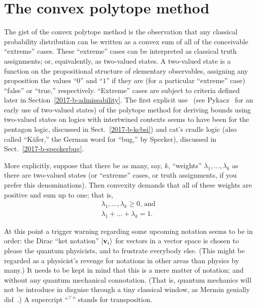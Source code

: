 \documentclass[%
  twocolumn,
 showpacs,
 showkeys,
 preprintnumbers,
 amsmath,amssymb,
 aps,
  pra,
  longbibliography,
 floatfix,
 ]{revtex4-1}
\begin{document}
\section{The convex polytope method}
\label{2017-b-chm}

The gist of the convex polytope method is the observation that
any classical probability distribution can be written as a convex sum of all of the conceivable ``extreme'' cases.
These ``extreme'' cases can be interpreted as classical truth assignments; or, equivalently,
as two-valued states. A two-valued state is a function on the propositional structure of elementary observables,
assigning any proposition the values ``$0$'' and ``$1$'' if they are (for a particular ``extreme'' case)
``false'' or ``true,'' respectively.
``Extreme'' cases are subject to  criteria defined later in Section~\ref{2017-b-admissability}.
The first explicit use~\cite{svozil-2001-cesena,svozil-2001-eua,svozil-2008-ql,svozil-2016-s}
(see Pykacz~\cite{Pykacz1989} for an early use of two-valued states)
of the polytope method for deriving bounds using two-valued states on logics with intertwined contexts
seems to have been for the pentagon logic, discussed in Sect.~\ref{2017-b-kcbsi}) and cat's cradle logic
(also called ``K\"afer,'' the German word for ``bug,'' by Specker), discussed in Sect.~\ref{2017-b-speckerbug}.


More explicitly, suppose that there be as many, say, $k$, ``weights'' $\lambda_1, \ldots ,\lambda_k$ as there are two-valued states
(or ``extreme'' cases, or truth assignments, if you prefer this denominations).
Then convexity demands that all of these weights are positive and sum up to one; that is,
\begin{equation}
\begin{split}
\lambda_1, \ldots , \lambda_k  \ge 0
\text{, and }
\\
\lambda_1 + \ldots + \lambda_k   = 1
.
\label{2017-b-convexity}
\end{split}
\end{equation}


At this point a trigger warning regarding some upcoming notation seems to be in order:
the Dirac ``ket notation'' $\vert {\bf v}_i \rangle$ for  vectors in a vector space is chosen to please the
quantum physicists, and to frustrate everybody else.
(This might be regarded as a physicist's revenge for notations in other areas than physics by many.)
It needs to be kept in mind that this is a mere matter of notation; and without any quantum mechanical connotation.
(That is, quantum mechanics will not be introduce in disguise through a tiny classical window,
as Mermin genially did~\cite{mermin-07}.)
A supercript ``$^\intercal$'' stands for transposition.
\end{document}
